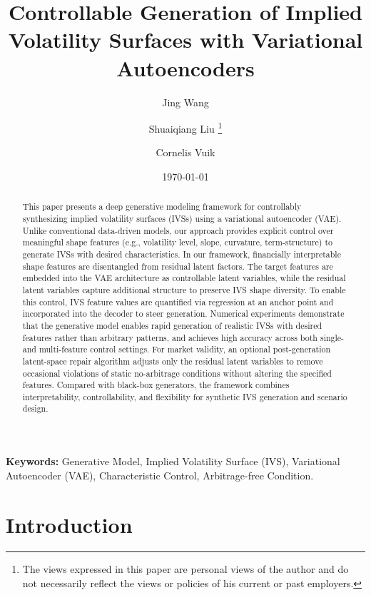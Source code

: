 \documentclass{article}
\title{Controllable Generation of Implied Volatility Surfaces with Variational Autoencoders}
\author[1]{Jing Wang}
\author[1,2]{Shuaiqiang Liu \footnote{The views expressed in this paper are  personal views of the author and do not necessarily reflect the views or policies of his current or past employers.}}
\author[1]{Cornelis Vuik}
\affil[1]{Numerical Analysis, Delft University of Technology, Delft, the Netherlands}
\affil[2]{ING Bank, Amsterdam, the Netherlands}
\date{\today}
\begin{document}
\maketitle
\begin{abstract}
This paper presents a deep generative modeling framework for controllably synthesizing implied volatility surfaces (IVSs) using a variational autoencoder (VAE). Unlike conventional data-driven models, our approach provides explicit control over meaningful shape features (e.g., volatility level, slope, curvature, term-structure) to generate IVSs with desired characteristics.
In our framework, financially interpretable shape features are disentangled from residual latent factors. The target features are embedded into the VAE architecture as controllable latent variables, while the residual latent variables capture additional structure to preserve IVS shape diversity. To enable this control, IVS feature values are quantified via regression at an anchor point and incorporated into the decoder to steer generation.
Numerical experiments demonstrate that the generative model enables rapid generation of realistic IVSs with desired features rather than arbitrary patterns,  and achieves high accuracy across both single- and multi-feature control settings. For market validity, an optional post-generation latent-space repair algorithm adjusts only the residual latent variables to remove occasional violations of static no-arbitrage conditions without altering the specified features.
Compared with black-box generators, the framework combines interpretability, controllability, and flexibility for synthetic IVS generation and scenario design.



\end{abstract}

\textbf{Keywords:} Generative Model, Implied Volatility Surface (IVS), Variational Autoencoder (VAE), Characteristic Control, Arbitrage-free Condition.
\tableofcontents



\section{Introduction}
\end{document}
